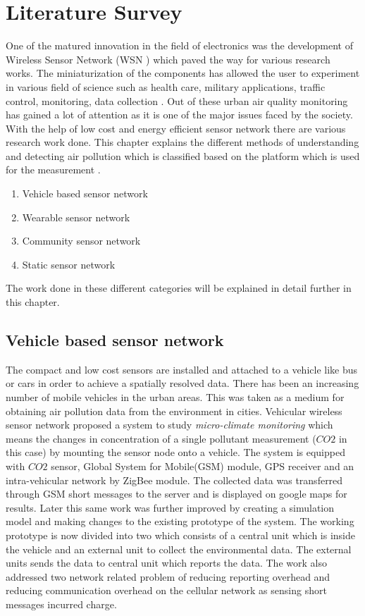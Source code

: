 \chapter{Literature Survey}

One of the matured innovation in the field of electronics was the development of Wireless Sensor Network (WSN ) which paved the way for various research works. The miniaturization of the components has allowed the user to experiment in various field of science such as health care, military applications, traffic control, monitoring, data collection \cite{Khedo2017} \cite{Liu2017}. Out of these urban air quality monitoring has gained a lot of attention as it is one of the major issues faced by the society. With the help of low cost and energy efficient sensor network there are various research work done. This chapter explains the different methods of understanding and detecting air pollution which is classified based on the platform which is used for the measurement\cite{Yi2015} \cite{Pavani2017}.
\begin{enumerate}

    \item Vehicle based sensor network
    \item Wearable sensor network
    \item Community sensor network
    \item Static sensor network

 \end{enumerate} 

 The work done in these different categories will be explained in detail further in this chapter.

\section{Vehicle based sensor network}

The compact and low cost sensors are installed and attached to a vehicle like bus or cars in order to achieve a spatially resolved data. There has been an increasing number of mobile vehicles in the urban areas. This was taken as a medium for obtaining air pollution data from the environment in cities. Vehicular wireless sensor network \cite{Hu2009} proposed a system to study \textit{micro-climate monitoring} which means the changes in concentration of a single pollutant measurement ($CO2$ in this case) by mounting the sensor node onto a vehicle. The system is equipped with $CO2$ sensor, Global System for Mobile(GSM) module, GPS receiver and  an intra-vehicular network by ZigBee module. The collected data was transferred through GSM short messages to the server and is displayed on google maps for results. Later this same work was further improved \cite{Hu2011} by creating a simulation model and making changes to the existing prototype of the system. The working prototype is now divided into two which consists of a central unit which is inside the vehicle and an external unit to collect the environmental data. The external units sends the data to central unit which reports the data. The work also addressed two network related problem of reducing reporting overhead and reducing communication overhead on the cellular network as sensing short messages incurred charge. 

